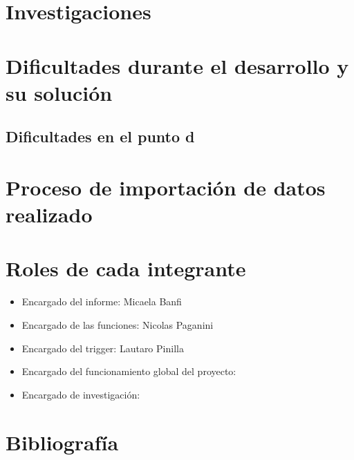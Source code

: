 \documentclass[12pt]{article}
\begin{document}
\section{Investigaciones}

\section{Dificultades durante el desarrollo y su soluci\'on}
\subsection{Dificultades en el punto d}

\section{Proceso de importaci\'on de datos realizado}

\section{Roles de cada integrante}
\begin{itemize}
  \item Encargado del informe: Micaela Banfi
  \item Encargado de las funciones: Nicolas Paganini
  \item Encargado del trigger: Lautaro Pinilla
  \item Encargado del funcionamiento global del proyecto: 
  \item Encargado de investigación: 
\end{itemize}
\section{Bibliograf\'ia} 
\end{document}
